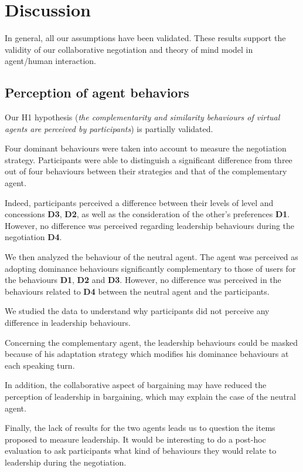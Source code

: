 \documentclass[10pt, a4paper, twocolumn]{article} %
\begin{document}
\section{Discussion}
\label{sec:discussion}
In general, all our assumptions have been validated. These results support the validity of our collaborative negotiation and theory of mind model in agent/human interaction.   

\subsection{Perception of agent behaviors}
Our H1 hypothesis (\textit{the complementarity and similarity behaviours of virtual agents are perceived by participants}) is partially validated. 

Four dominant behaviours were taken into account to measure the negotiation strategy. 
Participants were able to distinguish a significant difference from three out of four behaviours between their strategies and that of the complementary agent.

Indeed, participants perceived a difference between their levels of level and concessions \textbf{D3}, \textbf{D2}, as well as the consideration of the other's preferences \textbf{D1}. However, no difference was perceived regarding leadership behaviours during the negotiation \textbf{D4}. 

We then analyzed the behaviour of the neutral agent. The agent was perceived as adopting dominance behaviours significantly complementary to those of users for the behaviours \textbf{D1}, \textbf{D2} and \textbf{D3}. 
However, no difference was perceived in the behaviours related to \textbf{D4} between the neutral agent and the participants. 

We studied the data to understand why participants did not perceive any difference in leadership behaviours. 

Concerning the complementary agent, the leadership behaviours could be masked because of his adaptation strategy which modifies his dominance behaviours at each speaking turn.

In addition, the collaborative aspect of bargaining may have reduced the perception of leadership in bargaining, which may explain the case of the neutral agent. 

Finally, the lack of results for the two agents leads us to question the items proposed to measure leadership. 
It would be interesting to do a post-hoc evaluation to ask participants what kind of behaviours they would relate to leadership during the negotiation.
\end{document}
